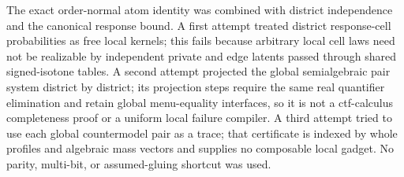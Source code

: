 The exact order-normal atom identity was combined with district independence and the canonical response bound.  A first attempt treated district response-cell probabilities as free local kernels; this fails because arbitrary local cell laws need not be realizable by independent private and edge latents passed through shared signed-isotone tables.  A second attempt projected the global semialgebraic pair system district by district; its projection steps require the same real quantifier elimination and retain global menu-equality interfaces, so it is not a ctf-calculus completeness proof or a uniform local failure compiler.  A third attempt tried to use each global countermodel pair as a trace; that certificate is indexed by whole profiles and algebraic mass vectors and supplies no composable local gadget.  No parity, multi-bit, or assumed-gluing shortcut was used.
